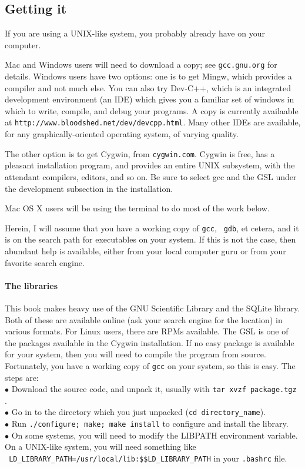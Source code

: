 \documentclass[12pt]{article}
\makeatletter
\def\ind#1{\index{#1}#1}
\def\ttind#1{\index{#1@{\tt #1}}{\tt #1}}
\makeatother
\begin{document}
\subsection{Getting it} If you are using a UNIX-like system, you probably already have \ttind{gcc} on your
computer.

Mac and Windows users will need to download a copy; see {\tt gcc.gnu.org}
for details. Windows users have two options: one is to get Mingw,
which provides a compiler and not much else. You can also try Dev-C++, which is an integrated development
environment (an IDE) which gives you a familiar set of windows in which to write, compile, and debug your
programs. A copy is currently availaable at {\tt http://www.bloodshed.net/dev/devcpp.html}.
Many other IDEs are available, for any graphically-oriented operating system, of varying quality.

The other option is to get Cygwin, from {\tt cygwin.com}. Cygwin is
free, has a pleasant installation program, and provides an entire
UNIX subsystem, with the attendant compilers, editors, and so on. Be
sure to select gcc and the GSL under the development subsection in the
installation.

Mac OS X users will be using the terminal to do most of the work below.

Herein, I will assume that you have a working copy of {\tt gcc}, {\tt
gdb}, et cetera, and it is on the search path for executables on your
system. If this is not the case, then abundant help is available, either
from your local computer guru or from your favorite search engine.

\paragraph{The \ind{libraries}} This book makes heavy use of the GNU Scientific Library and the SQLite library.
Both of these are available online (ask your search engine for the location) in various formats. For Linux users,
there are RPMs available. The GSL is one of the packages available in the Cygwin installation. If no easy
package is available for your system, then you will need to compile the program from source. Fortunately,
you have a working copy of {\tt gcc} on your system, so this is easy. The steps are:\\
$\bullet$ Download the source code, and unpack it, usually with {\tt tar xvzf package.tgz} .\\
$\bullet$ Go in to the directory which you just unpacked ({\tt cd directory\_name}).\\
$\bullet$ Run {\tt ./configure; make; make install} to configure and install the library.\\
$\bullet$ On some systems, you will need to modify the LIBPATH environment variable. 
On a UNIX-like system, you will need something like\\ {\tt 
        LD\_LIBRARY\_PATH=/usr/local/lib:\$\$LD\_LIBRARY\_PATH} in your {\tt .bashrc} file.
\end{document}
